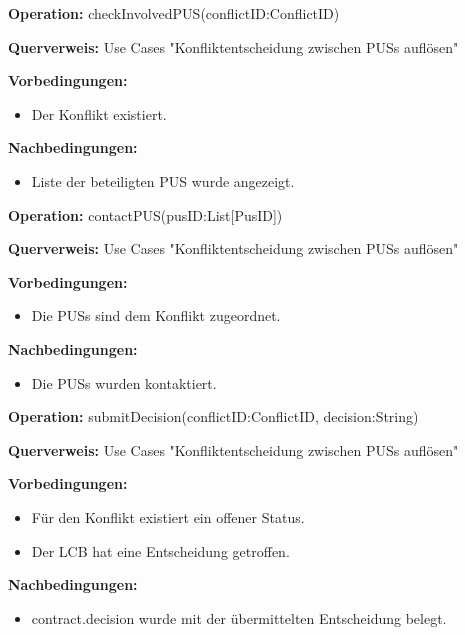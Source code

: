 \documentclass[a4paper,12pt]{article}
\begin{document}
	\begin{contractbox}
		\textbf{Operation:} checkInvolvedPUS(conflictID:ConflictID)
		
		\textbf{Querverweis:} Use Cases "Konfliktentscheidung zwischen PUSs auflösen"
		
		\textbf{Vorbedingungen:}
		\begin{itemize}[noitemsep]
			\item Der Konflikt existiert.
		\end{itemize}
		
		\textbf{Nachbedingungen:}
		\begin{itemize}[noitemsep]
			\item Liste der beteiligten PUS wurde angezeigt.
		\end{itemize}
	\end{contractbox}
	
	\begin{contractbox}
		\textbf{Operation:} contactPUS(pusID:List[PusID])
		
		\textbf{Querverweis:} Use Cases "Konfliktentscheidung zwischen PUSs auflösen"
		
		\textbf{Vorbedingungen:}
		\begin{itemize}[noitemsep]
			\item Die PUSs sind dem Konflikt zugeordnet.
		\end{itemize}
		
		\textbf{Nachbedingungen:}
		\begin{itemize}[noitemsep]
			\item Die PUSs wurden kontaktiert.
		\end{itemize}
	\end{contractbox}
	

	\begin{contractbox}
		\textbf{Operation:} submitDecision(conflictID:ConflictID, decision:String)
		
	\textbf{Querverweis:} Use Cases "Konfliktentscheidung zwischen PUSs auflösen"
		
		\textbf{Vorbedingungen:}
		\begin{itemize}[noitemsep]
			\item Für den Konflikt existiert ein offener Status.
			\item Der LCB hat eine Entscheidung getroffen.
		\end{itemize}
		
		\textbf{Nachbedingungen:}
		\begin{itemize}[noitemsep]
			\item contract.decision wurde mit der übermittelten Entscheidung belegt.
		\end{itemize}
	\end{contractbox}
	
\end{document}

